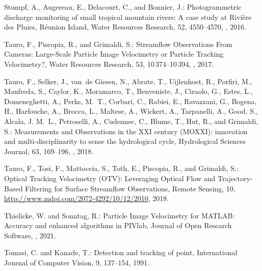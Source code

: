 \documentclass[hess, manuscript]{copernicus} %
\begin{document}
\begin{thebibliography}{70}
Stumpf, A., Augereau, E., Delacourt, C., and Bonnier, J.: Photogrammetric
  discharge monitoring of small tropical mountain rivers: A case study at
  Rivière des Pluies, Réunion Island, Water Resources Research, 52,
  4550--4570, , 2016.

Tauro, F., Piscopia, R., and Grimaldi, S.: Streamflow Observations From
  Cameras: Large-Scale Particle Image Velocimetry or Particle Tracking
  Velocimetry?, Water Resources Research, 53, 10\,374--10\,394,
  , 2017.

Tauro, F., Selker, J., van~de Giesen, N., Abrate, T., Uijlenhoet, R., Porfiri,
  M., Manfreda, S., Caylor, K., Moramarco, T., Benveniste, J., Ciraolo, G.,
  Estes, L., Domeneghetti, A., Perks, M.~T., Corbari, C., Rabiei, E.,
  Ravazzani, G., Bogena, H., Harfouche, A., Brocca, L., Maltese, A., Wickert,
  A., Tarpanelli, A., Good, S., Alcala, J. M.~L., Petroselli, A., Cudennec, C.,
  Blume, T., Hut, R., and Grimaldi, S.: Measurements and Observations in the
  XXI century (MOXXI): innovation and multi-disciplinarity to sense the
  hydrological cycle, Hydrological Sciences Journal, 63, 169--196,
  , 2018{}.

Tauro, F., Tosi, F., Mattoccia, S., Toth, E., Piscopia, R., and Grimaldi, S.:
  Optical Tracking Velocimetry (OTV): Leveraging Optical Flow and
  Trajectory-Based Filtering for Surface Streamflow Observations, Remote
  Sensing, 10, \urlprefix\url{http://www.mdpi.com/2072-4292/10/12/2010},
  2018{}.

Thielicke, W. and Sonntag, R.: Particle Image Velocimetry for MATLAB: Accuracy
  and enhanced algorithms in PIVlab, Journal of Open Research Software,
  , 2021.

Tomasi, C. and Kanade, T.: Detection and tracking of point, International
  Journal of Computer Vision, 9, 137--154, 1991.


\end{thebibliography}
\end{document}
